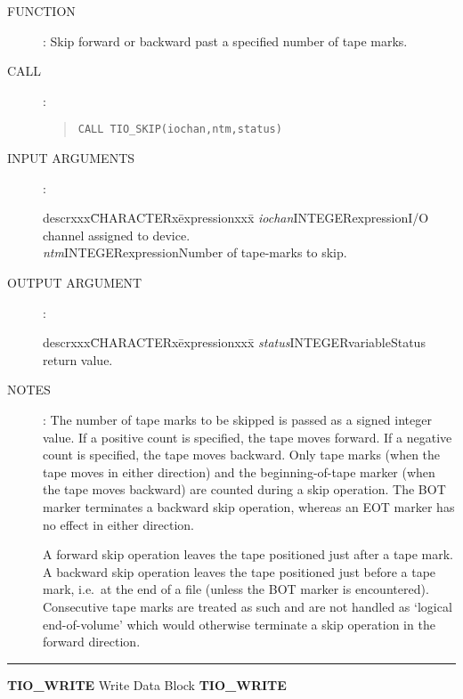 \begin{description}
\item [FUNCTION]:
Skip forward or backward past a specified number of tape marks.
\item [CALL]:
\begin{quote}
{\tt CALL TIO\_SKIP(iochan,ntm,status)}
\end{quote}
\item [INPUT ARGUMENTS]:
\begin{tabbing}
descrxxx\=CHARACTERx\=expressionxxx\=\kill
{\em iochan}\>INTEGER\>expression\>I/O channel assigned to device.\\
{\em ntm}\>INTEGER\>expression\>Number of tape-marks to skip.
\end{tabbing}
\item [OUTPUT ARGUMENT]:
\begin{tabbing}
descrxxx\=CHARACTERx\=expressionxxx\=\kill
{\em status}\>INTEGER\>variable\>Status return value.
\end{tabbing}
\item [NOTES]:
The number of tape marks to be skipped is passed as a signed integer value.
If a positive count is specified, the tape moves forward.
If a negative count is specified, the tape moves backward.
Only tape  marks (when the tape moves in either direction) and the
beginning-of-tape marker (when the tape moves backward) are counted during a
skip operation.
The BOT marker terminates a backward skip operation, whereas an EOT marker has
no effect in either direction.

A forward skip operation leaves the tape positioned just after a tape mark.
A backward skip operation leaves the tape positioned just before a tape mark,
i.e.\ at the end of a file (unless the BOT marker is encountered).
Consecutive tape marks are treated as such and are not handled as `logical
end-of-volume' which would otherwise terminate a skip operation in the forward
direction.
\end{description}
\goodbreak
\rule{\textwidth}{0.3mm}
{\Large {\bf TIO\_WRITE} \hfill Write Data Block \hfill {\bf TIO\_WRITE}}
